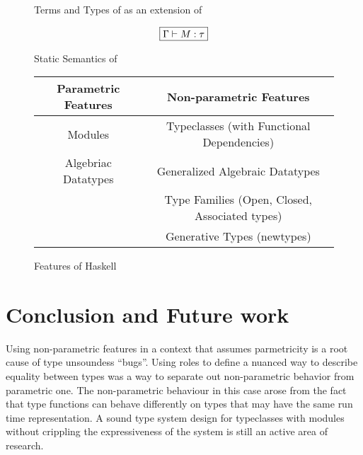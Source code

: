 \documentclass[manuscript,screen,nonacm]{acmart}
\begin{document}
\begin{figure}[ht]
  \centering
  \caption{Terms and Types of \SFK as an extension of \SFC}
  \label{fig:system-fck-syntax}
\end{figure}


\begin{figure}[ht]
  \centering
  \begin{gather*}
    \fbox{$\Gamma \vdash M : \tau$}
  \end{gather*}
  \caption{Static Semantics of \SFK}
  \label{fig:sfk-typing}
\end{figure}


\begin{figure}[ht]
  \centering
  \begin{tabular}[ht]{c | c}
    Parametric Features & Non-parametric Features \\
    \hline
    Modules             & Typeclasses (with Functional Dependencies)\\
    Algebriac Datatypes & Generalized Algebraic Datatypes\\
                        & Type Families (Open, Closed, Associated types)\\
                        & Generative Types (newtypes)
  \end{tabular}
  \caption{Features of Haskell}
  \label{fig:haskell-lang-features}
\end{figure}

\section{Conclusion and Future work}\label{sec:conclusion}
Using non-parametric features in a context that assumes parmetricity is a root cause of type unsoundess ``bugs''.
Using roles to define a nuanced way to describe equality between types was a way to separate out non-parametric behavior from parametric one. The non-parametric behaviour in this case arose from the fact that type functions can behave differently on types that may have the same run time representation. 
A sound type system design for typeclasses with modules without crippling the expressiveness of the system is still an active area of research. 


\newpage

\end{document}
